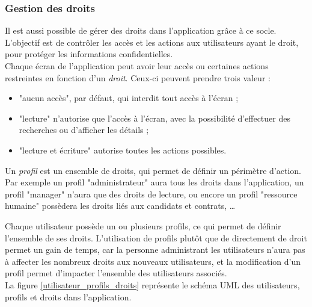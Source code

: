 
\subsubsection{Gestion des droits}

Il est aussi possible de gérer des droits dans l'application grâce à ce socle. L'objectif est de contrôler les accès et les actions aux utilisateurs ayant le droit, pour protéger les informations confidentielles.
\\

Chaque écran de l'application peut avoir leur accès ou certaines actions restreintes en fonction d'un \textit{droit}. Ceux-ci peuvent prendre trois valeur : 
\begin{itemize}
	\item "aucun accès", par défaut, qui interdit tout accès à l'écran ;
	\item "lecture" n'autorise que l'accès à l'écran, avec la possibilité d'effectuer des recherches ou d'afficher les détails ;
	\item "lecture et écriture" autorise toutes les actions possibles.
\end{itemize}

Un \textit{profil} est un ensemble de droits, qui permet de définir un périmètre d'action. Par exemple un profil "administrateur" aura tous les droits dans l'application, un profil "manager" n'aura que des droits de lecture, ou encore un profil "ressource humaine" possèdera les droits liés aux candidats et contrats, \ldots

Chaque utilisateur possède un ou plusieurs profils, ce qui permet de définir l'ensemble de ses droits. L'utilisation de profils plutôt que de directement de droit permet un gain de temps, car la personne administrant les utilisateurs n'aura pas à affecter les nombreux droits aux nouveaux utilisateurs, et la modification d'un profil permet d'impacter l'ensemble des utilisateurs associés.
\\

La figure \ref{utilisateur_profils_droits} représente le schéma UML des utilisateurs, profils et droits dans l'application.

